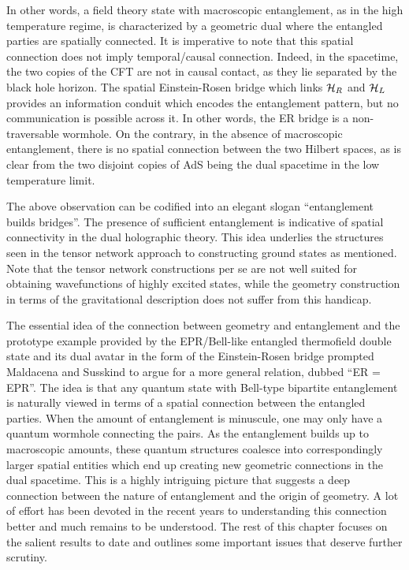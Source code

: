 \documentclass[12pt,openany]{book}
\begin{document}
In other words, a field theory state with macroscopic entanglement, as in the high temperature regime, is characterized  by a geometric dual where the entangled parties are spatially connected. It is imperative to note that this spatial connection does not imply temporal/causal connection. Indeed, in the \SAdS{} spacetime, the two copies of the CFT are not in causal contact, as they lie separated by the black hole horizon. The spatial Einstein-Rosen bridge which links ${\cal H} _R $ and ${\cal H}_L$ provides an information conduit which encodes the entanglement pattern, but no communication is possible across it. In other words, the ER bridge is a non-traversable wormhole.  On the contrary, in the absence of macroscopic entanglement,  there is no spatial connection between the two Hilbert spaces, as is clear from the two disjoint copies of AdS being the dual spacetime in the low temperature limit.

The above observation can be codified into an elegant slogan ``entanglement builds bridges''. The presence of sufficient entanglement is indicative of spatial connectivity in the dual holographic theory. This idea underlies the structures seen in the tensor network approach to constructing ground states as mentioned. Note that the tensor network constructions per se are not well suited for obtaining wavefunctions of highly excited states, while the geometry construction in terms of the gravitational description does not suffer from this handicap.

The essential idea of the connection between geometry and entanglement and the prototype example provided by the EPR/Bell-like entangled thermofield double state and its dual avatar in the form of the Einstein-Rosen bridge prompted Maldacena and Susskind to argue for a more general relation, dubbed ``ER = EPR''. The idea is that any quantum state with Bell-type bipartite entanglement is naturally viewed in terms of a spatial connection between the entangled parties. When the amount of entanglement is minuscule, one may only have a quantum wormhole connecting the pairs. As the entanglement builds up to macroscopic amounts, these quantum structures coalesce into correspondingly larger spatial entities which end up creating new geometric connections in the dual spacetime. This is a highly intriguing picture that suggests a deep connection between the nature of entanglement and the origin of geometry. A lot of effort has been devoted in the recent years to understanding this connection better and much remains to be understood. The rest of this chapter focuses on the salient results to date and outlines some important issues that deserve further scrutiny.
\end{document}
